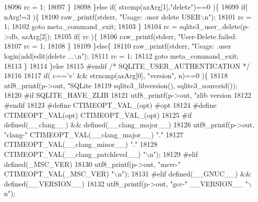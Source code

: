 \begin{DoxyCode}
{{{{{{{{{{{{{{{{{{{{{{{{{{{{{{{{{{{{{{{{{{{{{{{{{{{{{{{{{{{{{{{{{{{{{{{{{{{{{{{{{{{{{{{{{{{{{{{{{{{{{{{{{{{{{{{{{{{{{{{{{{{{{{{{{{{{{{{{{{{{{{{{{{{{{{{{18096         rc = 1;
18097       \}
18098     \}\textcolor{keywordflow}{else} \textcolor{keywordflow}{if}( strcmp(azArg[1],\textcolor{stringliteral}{"delete"})==0 )\{
18099       \textcolor{keywordflow}{if}( nArg!=3 )\{
18100         raw_printf(stderr, \textcolor{stringliteral}{"Usage: .user delete USER\(\backslash\)n"});
18101         rc = 1;
18102         \textcolor{keywordflow}{goto} meta\_command\_exit;
18103       \}
18104       rc = sqlite3\_user\_delete(p->db, azArg[2]);
18105       \textcolor{keywordflow}{if}( rc )\{
18106         raw_printf(stderr, \textcolor{stringliteral}{"User-Delete failed: %
18107         rc = 1;
18108       \}
18109     \}\textcolor{keywordflow}{else}\{
18110       raw_printf(stderr, \textcolor{stringliteral}{"Usage: .user login|add|edit|delete ...\(\backslash\)n"});
18111       rc = 1;
18112       \textcolor{keywordflow}{goto} meta\_command\_exit;
18113     \}
18114   \}\textcolor{keywordflow}{else}
18115 \textcolor{preprocessor}{#endif }\textcolor{comment}{/* SQLITE\_USER\_AUTHENTICATION */}\textcolor{preprocessor}{}
18116 
18117   \textcolor{keywordflow}{if}( c==\textcolor{charliteral}{'v'} && strncmp(azArg[0], \textcolor{stringliteral}{"version"}, n)==0 )\{
18118     utf8_printf(p->out, \textcolor{stringliteral}{"SQLite %
18119         sqlite3_libversion(), sqlite3_sourceid());
18120 \textcolor{preprocessor}{#if SQLITE\_HAVE\_ZLIB}
18121     utf8_printf(p->out, \textcolor{stringliteral}{"zlib version %
18122 \textcolor{preprocessor}{#endif}
18123 \textcolor{preprocessor}{#define CTIMEOPT\_VAL\_(opt) #opt}
18124 \textcolor{preprocessor}{#define CTIMEOPT\_VAL(opt) CTIMEOPT\_VAL\_(opt)}
18125 \textcolor{preprocessor}{#if defined(\_\_clang\_\_) && defined(\_\_clang\_major\_\_)}
18126     utf8_printf(p->out, \textcolor{stringliteral}{"clang-"} CTIMEOPT_VAL(\_\_clang\_major\_\_) \textcolor{stringliteral}{"."}
18127                     CTIMEOPT_VAL(\_\_clang\_minor\_\_) \textcolor{stringliteral}{"."}
18128                     CTIMEOPT_VAL(\_\_clang\_patchlevel\_\_) \textcolor{stringliteral}{"\(\backslash\)n"});
18129 \textcolor{preprocessor}{#elif defined(\_MSC\_VER)}
18130     utf8_printf(p->out, \textcolor{stringliteral}{"msvc-"} CTIMEOPT_VAL(\_MSC\_VER) \textcolor{stringliteral}{"\(\backslash\)n"});
18131 \textcolor{preprocessor}{#elif defined(\_\_GNUC\_\_) && defined(\_\_VERSION\_\_)}
18132     utf8_printf(p->out, \textcolor{stringliteral}{"gcc-"} \_\_VERSION\_\_ \textcolor{stringliteral}{"\(\backslash\)n"});
}}}}}}}}}}}}}}}}}}}}}}}}}}}}}}}}}}}}}}}}}}}}}}}}}}}}}}}}}}}}}}}}}}}}}}}}}}}}}}}}}}}}}}}}}}}}}}}}}}}}}}}}}}}}}}}}}}}}}}}}}}}}}}}}}}}}}}}}}}}}}}}}}}}}}}}}}}}
\end{DoxyCode}
